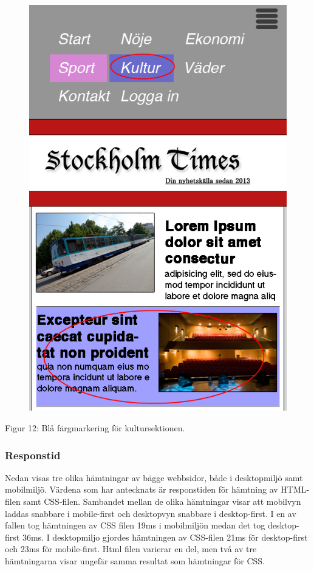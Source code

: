 \documentclass[11pt]{article}
\begin{document}
\begin{figure}[H]
{\includegraphics[scale=0.3]{pics/fargmobil.png}%
}
\end{figure}
\hspace{0.5cm}Figur 12: Blå färgmarkering för kultursektionen.


\subsubsection{Responstid}

Nedan visas tre olika hämtningar av bägge webbsidor, både i desktopmiljö samt mobilmiljö. Värdena som har antecknats är responstiden för hämtning av HTML-filen samt CSS-filen. Sambandet mellan de olika hämtningar visar att mobilvyn laddas snabbare i mobile-first och desktopvyn snabbare i desktop-first. I en av fallen tog hämtningen av CSS filen 19ms i mobilmiljön medan det tog desktop-first 36ms. I desktopmiljo gjordes hämtningen av CSS-filen 21ms för desktop-first och 23ms för mobile-first. Html filen varierar en del, men två av tre hämtningarna visar ungefär samma resultat som hämtningar för CSS.
\end{document}
